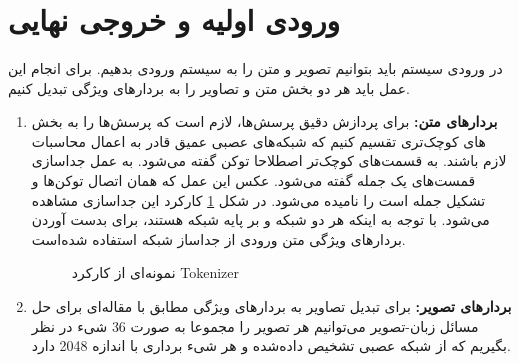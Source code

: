 \newpage

\section{
  ورودی اولیه و خروجی نهایی
 }

\paragraph{}{
    در ورودی سیستم باید بتوانیم تصویر و متن را به سیستم ورودی بدهیم. برای 
    انجام این عمل باید هر دو بخش متن  و تصاویر را به بردار‌های ویژگی تبدیل کنیم. 
    
    \begin{enumerate}
        \item \textbf{بردارهای متن:}
                برای پردازش دقیق پرسش‌ها، لازم است که پرسش‌ها را به 
                بخش ‌های کوچک‌تری تقسیم کنیم که شبکه‌های عصبی عمیق قادر به اعمال محاسبات
                لازم باشند. به قسمت‌های کوچک‌تر اصطلاحا توکن گفته می‌شود. 
                به عمل جداسازی قمست‌های یک جمله 
                گفته می‌شود. عکس این عمل که همان اتصال توکن‌ها و تشکیل جمله است را
                نامیده می‌شود. در شکل 
                \ref{fig:tokenization}
                کارکرد این جداسازی مشاهده می‌شود. با توجه به اینکه هر دو شبکه
                و
                بر پایه شبکه 
                هستند، برای بدست آوردن بردارهای ویژگی متن ورودی از جداساز 
                شبکه 
                استفاده شده‌است. 
                \begin{figure}[H]
                    \caption{نمونه‌ای از کارکرد Tokenizer}
                    \label{fig:tokenization}
                \end{figure}
        \item  \textbf{بردارهای تصویر:}
                برای تبدیل تصاویر به بردارهای ویژگی مطابق با مقاله‌ای برای حل
                مسائل زبان-تصویر 
                \cite{anderson2018bottom}
                می‌توانیم هر تصویر را مجموعا به صورت 36 شیء در نظر بگیریم که از 
                شبکه عصبی
                 \cite{ren2015faster}
                تشخیص داده‌شده و هر شیء برداری با اندازه 2048 دارد.
                            
    \end{enumerate}
}


